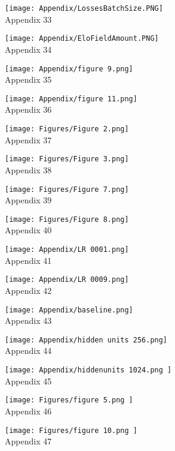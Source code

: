 \documentclass{LSkill}
\begin{document}
\begin{appendix}
\texttt{[image: Appendix/LossesBatchSize.PNG]}\\
Appendix 33

\texttt{[image: Appendix/EloFieldAmount.PNG]}\\
Appendix 34

\texttt{[image: Appendix/figure 9.png]}\\
Appendix 35

\texttt{[image: Appendix/figure 11.png]}\\
Appendix 36

\texttt{[image: Figures/Figure 2.png]}\\
Appendix 37

\texttt{[image: Figures/Figure 3.png]}\\
Appendix 38

\texttt{[image: Figures/Figure 7.png]}\\
Appendix 39

\texttt{[image: Figures/Figure 8.png]}\\
Appendix 40

\texttt{[image: Appendix/LR 0001.png]}\\
Appendix 41

\texttt{[image: Appendix/LR 0009.png]}\\
Appendix 42

\texttt{[image: Appendix/baseline.png]}\\
Appendix 43

\texttt{[image: Appendix/hidden units 256.png]}\\
Appendix 44

\texttt{[image: Appendix/hiddenunits 1024.png ]}\\
Appendix 45

\texttt{[image: Figures/figure 5.png ]}\\
Appendix 46

\texttt{[image: Figures/figure 10.png ]}\\
Appendix 47

\end{appendix}
\end{document}
